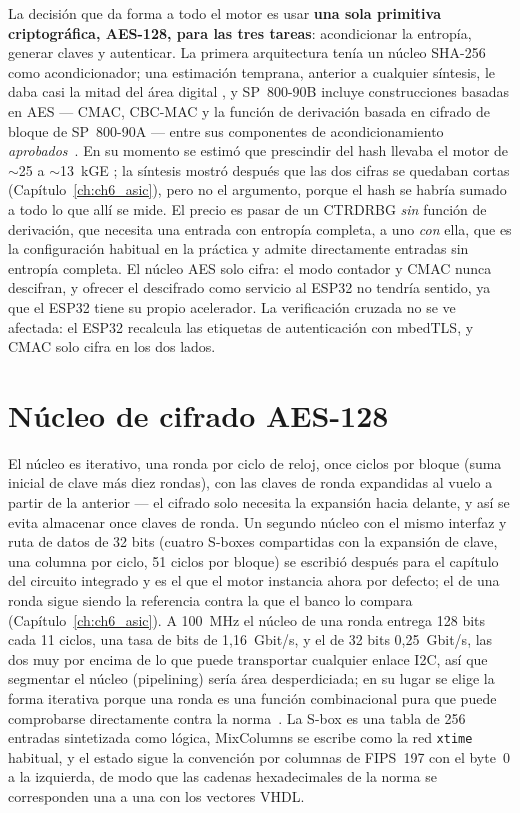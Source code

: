 La decisión que da forma a todo el motor es usar \textbf{una sola
primitiva criptográfica, AES-128, para las tres tareas}: acondicionar la
entropía, generar claves y autenticar. La primera arquitectura tenía un
núcleo SHA-256 como acondicionador; una estimación temprana, anterior a
cualquier síntesis, le daba casi la mitad del área digital \est{}, y
SP~800-90B incluye construcciones basadas en AES --- CMAC,
CBC-MAC y la función de derivación basada en cifrado de bloque de
SP~800-90A --- entre sus componentes de acondicionamiento
\emph{aprobados}~\cite{turan_2018_sp80090b}. En su momento se estimó que
prescindir del hash llevaba el motor de $\sim$25 a $\sim$13~kGE \est{};
la síntesis mostró después que las dos cifras se quedaban cortas
(Capítulo~\ref{ch:ch6_asic}), pero no el argumento, porque el hash se
habría sumado a todo lo que allí se mide. El precio es pasar de un
\ac{CTRDRBG} \emph{sin} función de derivación, que
necesita una entrada con entropía completa, a uno \emph{con} ella, que es
la configuración habitual en la práctica y admite directamente entradas
sin entropía completa. El núcleo AES solo cifra: el modo contador y CMAC
nunca descifran, y ofrecer el descifrado como servicio al ESP32 no
tendría sentido, ya que el ESP32 tiene su propio acelerador. La
verificación cruzada no se ve afectada: el ESP32 recalcula las etiquetas
de autenticación con mbedTLS, y CMAC solo cifra en los dos lados.

\section{Núcleo de cifrado AES-128}
\label{sec:aes}

El núcleo es iterativo, una ronda por ciclo de reloj, once ciclos por
bloque (suma inicial de clave más diez rondas), con las claves de ronda
expandidas al vuelo a partir de la anterior --- el cifrado solo necesita
la expansión hacia delante, y así se evita almacenar once claves de
ronda. Un segundo núcleo con el mismo interfaz y ruta de datos de 32 bits
(cuatro S-boxes compartidas con la expansión de clave, una columna por
ciclo, 51 ciclos por bloque) se escribió después para el capítulo del
circuito integrado y es el que el motor instancia ahora por defecto; el
de una ronda sigue siendo la referencia contra la que el banco lo compara
(Capítulo~\ref{ch:ch6_asic}). A 100~MHz el núcleo de una ronda entrega
128 bits cada 11 ciclos, una tasa de bits de 1,16~Gbit/s, y el de 32
bits 0,25~Gbit/s, las dos muy
por encima de lo que puede transportar cualquier enlace \ac{I2C}, así que
segmentar el núcleo (pipelining) sería área desperdiciada; en su lugar se
elige la forma iterativa porque una ronda es una función combinacional
pura que puede comprobarse directamente contra la
norma~\cite{nist_2023_fips197}. La S-box es una tabla de 256 entradas
sintetizada como lógica, MixColumns se escribe como la red \texttt{xtime}
habitual, y el estado sigue la convención por columnas de FIPS~197 con
el byte~0 a la izquierda, de modo que las cadenas hexadecimales de la
norma se corresponden una a una con los vectores VHDL.

